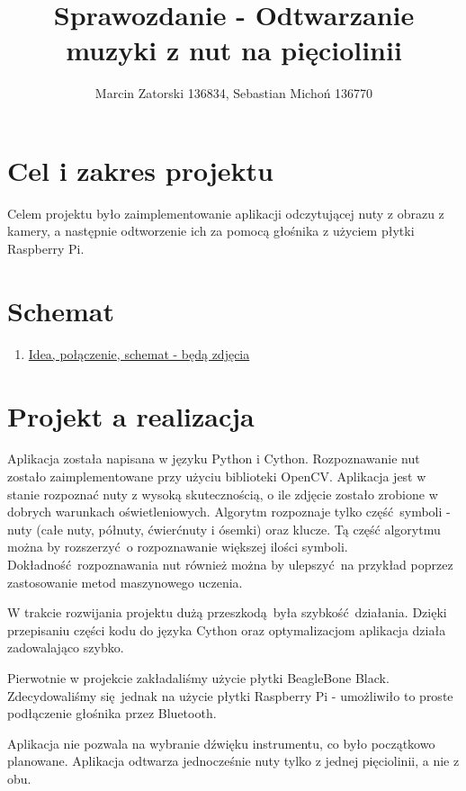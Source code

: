 \documentclass[12pt]{article}
\begin{document}
\title{Sprawozdanie - Odtwarzanie muzyki z nut na pięciolinii}
\author{Marcin Zatorski 136834, Sebastian Michoń 136770}
\date{\vspace{-2ex}}
\maketitle

\section{Cel i zakres projektu}
Celem projektu było zaimplementowanie aplikacji odczytującej nuty z obrazu z kamery, a następnie odtworzenie ich za pomocą głośnika z użyciem płytki Raspberry Pi.

\section{Schemat}
\begin{enumerate}
	\item \underline{Idea, połączenie, schemat - będą zdjęcia}
\end{enumerate}
	
\section{Projekt a realizacja}
Aplikacja została napisana w języku Python i Cython. Rozpoznawanie nut zostało zaimplementowane przy użyciu biblioteki OpenCV. Aplikacja jest w stanie rozpoznać nuty z wysoką skutecznością, o ile zdjęcie zostało zrobione w dobrych warunkach oświetleniowych. Algorytm rozpoznaje tylko część symboli - nuty (całe nuty, półnuty, ćwierćnuty i ósemki) oraz klucze. Tą część algorytmu można by rozszerzyć o rozpoznawanie większej ilości symboli. Dokładność rozpoznawania nut również można by ulepszyć na przykład poprzez zastosowanie metod maszynowego uczenia.
	
W trakcie rozwijania projektu dużą przeszkodą była szybkość działania. Dzięki przepisaniu części kodu do języka Cython oraz optymalizacjom aplikacja działa zadowalająco szybko.
	
Pierwotnie w projekcie zakładaliśmy użycie płytki BeagleBone Black. Zdecydowaliśmy się jednak na użycie płytki Raspberry Pi - umożliwiło to proste podłączenie głośnika przez Bluetooth.
	
Aplikacja nie pozwala na wybranie dźwięku instrumentu, co było początkowo planowane. Aplikacja odtwarza jednocześnie nuty tylko z jednej pięciolinii, a nie z obu.
	
\end{document}
